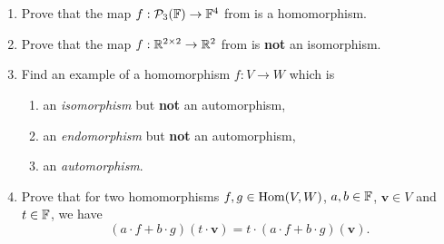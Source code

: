 \section*{}

\begin{enumerate}
 \item 
 Prove that the map $f:\mathcal{P}_3(\mathbb{F}) \to \mathbb{F}^{4}$ from
  is a homomorphism.
\item 
 Prove that the map $f:\mathbb{R}^{2 \times 2} \to \mathbb{R}^2$ from 
 is \textbf{not} an isomorphism.
\item 
 Find an example of a homomorphism $f:V \to W$ which is
 \begin{enumerate}[label=(\alph*)]
  \item an \emph{isomorphism} but \textbf{not} an automorphism,
  \item an \emph{endomorphism} but \textbf{not} an automorphism,
  \item an \emph{automorphism}.
 \end{enumerate}
\item 
 Prove that for two homomorphisms $f,g \in \operatorname{Hom}(V,W)$, $a,b \in \mathbb{F}$, $\mathbf{v}
 \in V$ and $t \in \mathbb{F}$, we have
 \[
  (a \cdot f + b \cdot g)(t \cdot \mathbf{v}) = t \cdot (a \cdot f + b \cdot
  g)(\mathbf{v}).
 \]
\end{enumerate}
